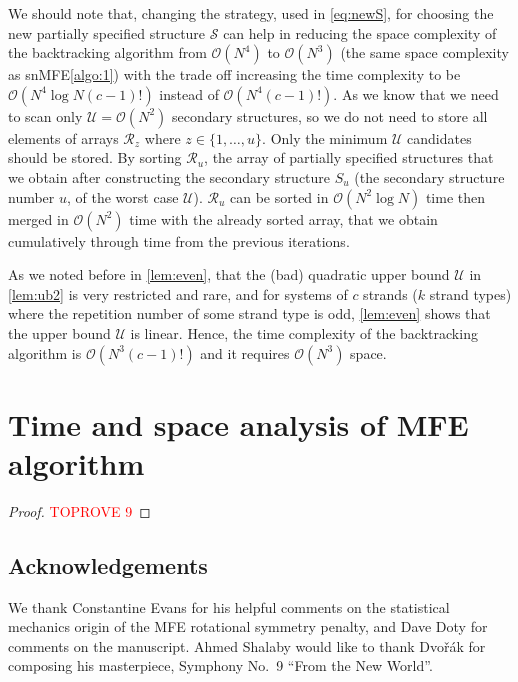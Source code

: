 \documentclass[11pt,letterpaper]{article}  \usepackage[margin=1in]{geometry}
\theoremstyle{definition}  \newtheorem{Definition}[theorem]{Definition}
\newcommand{\snMFE}{snMFE\xspace}
\begin{document}
\begin{remark}\label{remark:newT}
	We should note that, changing the strategy, used in \cref{eq:newS}, for choosing the new partially specified structure $\mathcal{S}$ can help in reducing the space complexity of the backtracking algorithm from $\mathcal{O}(N^4)$ to $\mathcal{O}(N^3)$ (the same space complexity as \snMFE \cref{algo:1}) with the trade off increasing the time complexity to be $\mathcal{O}(N^4 \log N(c-1)!)$ instead of $\mathcal{O}(N^4 (c-1)!)$. As we know that we need to scan only $\mathcal{U} = \mathcal{O}(N^2)$ secondary structures, so we do not need to store all elements of arrays $\mathcal{R}_z$ where $z \in \{1,\ldots,u\}$. 
	Only the minimum $\mathcal{U}$ candidates should be stored. By sorting $\mathcal{R}_u$, the array of partially specified structures that we obtain after constructing the secondary structure $S_u$ (the secondary structure number $u$, of the worst case $\mathcal{U}$). $\mathcal{R}_u$ can be sorted in $\mathcal{O}(N^2 \log N)$ time then merged in $\mathcal{O}(N^2)$ time with the already sorted array, that we obtain cumulatively through time from the previous iterations.        
\end{remark} 

As we noted before in \cref{lem:even}, that the (bad) quadratic upper bound $\mathcal{U}$ in \cref{lem:ub2} is very restricted and rare, and 
for systems of $c$ strands ($k$ strand types) where the repetition number of some strand type is odd, \cref{lem:even} shows that the upper bound $\mathcal{U}$ is linear. Hence, the time complexity of the backtracking algorithm is $\mathcal{O}(N^3(c-1)!)$ and it requires $\mathcal{O}(N^3)$ space.




\section{Time and space analysis of MFE algorithm}\label{sec:analysis}

\main*


\begin{proof}\textcolor{red}{TOPROVE 9}\end{proof}

 	
	\subsection*{Acknowledgements} 
	We thank Constantine Evans for his helpful comments on the statistical mechanics origin of the MFE rotational symmetry penalty, and Dave Doty for comments on the manuscript. Ahmed Shalaby would like to thank Dvořák for composing his masterpiece, Symphony No.~9 ``From the New World''. 
	
\end{document}
